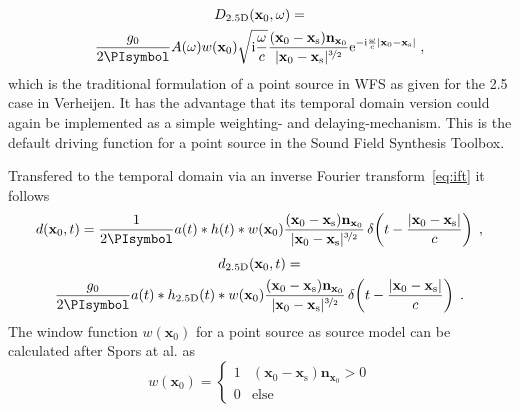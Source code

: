 \documentclass[a4paper]{book}
\newcommand{\PI}{\PIsymbol}%
\newcommand{\I}{\mathrm{i}}                          %
\newcommand{\E}{\mathrm{e}}                          %
\renewcommand{\vec}[1]{\mathbf{#1}}                  %
\newcommand{\x}{\vec{x}}                             %
\newcommand{\xs}{\x_\text{s}}                        %
\newcommand{\n}{\vec{n}}                             %
\newcommand{\omegac}{\frac{\omega}{c}}               %
\newcommand{\deltafunc}[1]{\,\delta\!\left(#1\right)}%
\newcommand{\qc}{\;,}                                             %
\newcommand{\qp}{\;.}                                             %
\def \twohalfD {{2.5\text{D}}\xspace}                             %
\newcommand\eqlabel[2][]{%
  \label{eq:#2}%
}
\begin{document}
%
\begin{multline}
    D_\twohalfD(\x_0,\omega) = \\
    \frac{g_0}{2\PI} A(\omega) w(\x_0) \sqrt{\I\omegac}
    \frac{(\x_0-\xs)\n_{\x_0}}{|\x_0-\xs|^{\nicefrac{3}{2}}}
    \E^{-\I\omegac |\x_0-\xs|} \qc
    \eqlabel{D:wfs:ps:2.5D}
\end{multline}
%
which is the traditional formulation of a point source in
WFS as given for the \twohalfD case in
Verheijen.\cite[][(2.22a), whereby $r$ corresponds to $|\x_0-\xs|$ and
$\cos\varphi$ to $\frac{(\x_0-\xs)\n_{\x_0}}{|\x_0-\xs|}$]{Verheijen1997}
It has the advantage that its temporal domain version could again be implemented as
a simple weighting- and delaying-mechanism.
This is the default driving function for a point source in the Sound Field
Synthesis Toolbox.

Transfered to the temporal domain via an inverse Fourier transform~\eqref{eq:ift} it follows
%
\begin{equation}
    d(\x_0,t) = \frac{1}{2\PI} a(t) * h(t) * w(\x_0)
    \frac{(\x_0-\xs)\n_{\x_0}}{|\x_0-\xs|^{\nicefrac{3}{2}}}
    \deltafunc{t-\frac{|\x_0-\xs|}{c}} \qc
    \eqlabel{d:wfs:ps}
\end{equation}
%
\begin{multline}
    d_\twohalfD(\x_0,t) = \\
    \frac{g_0}{2\PI} a(t) * h_\twohalfD(t) * w(\x_0)
    \frac{(\x_0-\xs)\n_{\x_0}}{|\x_0-\xs|^{\nicefrac{3}{2}}}
    \deltafunc{t-\frac{|\x_0-\xs|}{c}} \qp
    \eqlabel{d:wfs:ps:2.5D}
\end{multline}
%
The window function $w(\x_0)$ for a point source as source model can be
calculated after Spors at al. as\cite{Spors2008}
%
\begin{equation}
    w(\x_0) = 
    \begin{cases}
        1 & (\x_0-\xs) \n_{\x_0} > 0 \\
        0 & \text{else}
    \end{cases}
    \eqlabel{wfs:ps:selection}
\end{equation}
%


\end{document}
